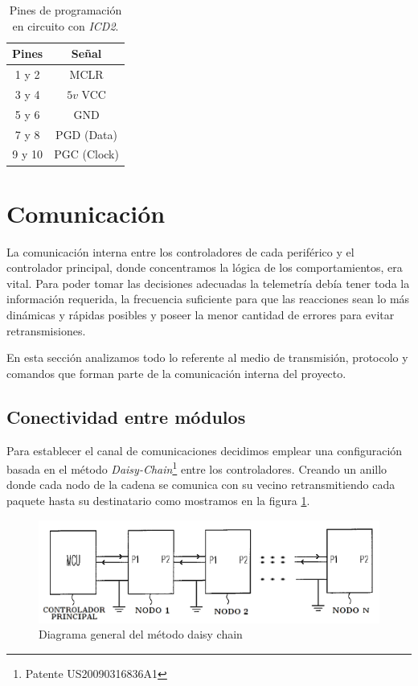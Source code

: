 \begin{table}
	\begin{center}
		\begin{tabular}{|c|c|}
			\hline
			Pines & Se\~nal \\
			\hline
			1 y 2 & MCLR \\
			\hline
			3 y 4 & $5v$ VCC \\
			\hline
			5 y 6 & GND \\
			\hline
			7 y 8 & PGD (Data) \\
			\hline
			9 y 10 & PGC (Clock) \\
			\hline
		\end{tabular}
		\caption{Pines de programaci\'on en circuito con \emph{ICD2}.}
		\label{hT_header_icd2}
	\end{center}
\end{table}


\section{Comunicaci\'on}
\label{h_comm}

La comunicaci\'on interna entre los controladores de cada perif\'erico y el controlador principal, donde concentramos
la l\'ogica de los comportamientos, era vital.
Para poder tomar las decisiones adecuadas la telemetr\'ia deb\'ia tener toda la informaci\'on requerida, la frecuencia
suficiente para que las reacciones sean lo m\'as din\'amicas y r\'apidas posibles y poseer la menor cantidad de errores
para evitar retransmisiones.

En esta secci\'on analizamos todo lo referente al medio de transmisi\'on, protocolo y comandos que forman parte de la
comunicaci\'on interna del proyecto.

\subsection{Conectividad entre m\'odulos}
\label{h_comm_conectividad}

Para establecer el canal de comunicaciones decidimos emplear una configuraci\'on basada en el m\'etodo
\emph{Daisy-Chain}\footnote{Patente US20090316836A1} entre los controladores.
Creando un anillo donde cada nodo de la cadena se comunica con su vecino retransmitiendo cada paquete
hasta su destinatario como mostramos en la figura \ref{hF_comm_daisychain}.

\begin{figure}[ht]
	\centering
	\includegraphics[scale=.40]{figuras/daisychain_diagram.png}
	\caption{Diagrama general del m\'etodo daisy chain}
	\label{hF_comm_daisychain}
\end{figure}

